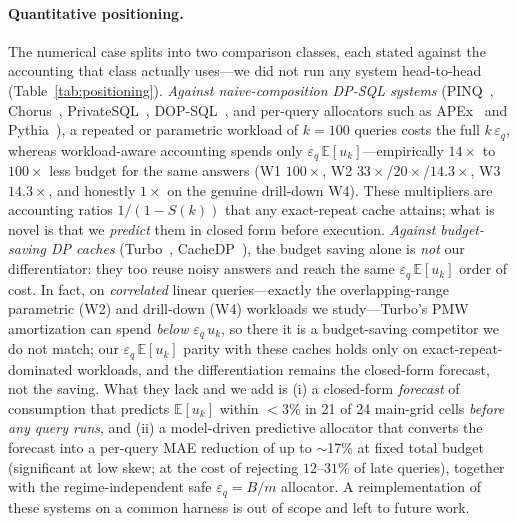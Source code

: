 \documentclass[sigconf,nonacm]{acmart}
\newcommand{\eps}{\varepsilon}
\newcommand{\E}{\mathbb{E}}
\begin{document}
\paragraph{Quantitative positioning.}
The numerical case splits into two comparison classes, each stated against the accounting that class actually uses---we did not run any system head-to-head (Table~\ref{tab:positioning}). \emph{Against naive-composition DP-SQL systems} (PINQ~\cite{mcsherry2009privacy}, Chorus~\cite{johnson2020chorus}, PrivateSQL~\cite{kotsogiannis2019privatesql}, DOP-SQL~\cite{yu2024dopsql}, and per-query allocators such as APEx~\cite{ge2019apex} and Pythia~\cite{kotsogiannis2017pythia}), a repeated or parametric workload of $k{=}100$ queries costs the full $k\,\eps_q$, whereas workload-aware accounting spends only $\eps_q\,\E[u_k]$---empirically $14\times$ to $100\times$ less budget for the same answers (W1 $100\times$, W2 $33\times$/$20\times$/$14.3\times$, W3 $14.3\times$, and honestly $1\times$ on the genuine drill-down W4). These multipliers are accounting ratios $1/(1-S(k))$ that any exact-repeat cache attains; what is novel is that we \emph{predict} them in closed form before execution. \emph{Against budget-saving DP caches} (Turbo~\cite{kostopoulou2023turbo}, CacheDP~\cite{mazmudar2023cachedp}), the budget saving alone is \emph{not} our differentiator: they too reuse noisy answers and reach the same $\eps_q\,\E[u_k]$ order of cost. In fact, on \emph{correlated} linear queries---exactly the overlapping-range parametric (W2) and drill-down (W4) workloads we study---Turbo's PMW amortization can spend \emph{below} $\eps_q\,u_k$, so there it is a budget-saving competitor we do not match; our $\eps_q\,\E[u_k]$ parity with these caches holds only on exact-repeat-dominated workloads, and the differentiation remains the closed-form forecast, not the saving. What they lack and we add is (i) a closed-form \emph{forecast} of consumption that predicts $\E[u_k]$ within $<3\%$ in 21 of 24 main-grid cells \emph{before any query runs}, and (ii) a model-driven predictive allocator that converts the forecast into a per-query MAE reduction of up to $\sim$17\% at fixed total budget (significant at low skew; at the cost of rejecting $12$--$31\%$ of late queries), together with the regime-independent safe $\eps_q=B/m$ allocator. A reimplementation of these systems on a common harness is out of scope and left to future work.
\end{document}
